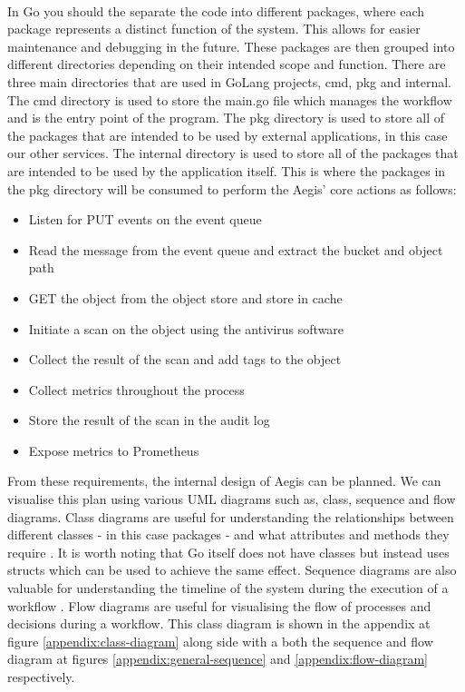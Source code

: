 \documentclass[12pt, conference, final, a4paper, onecolumn, compsoc]{IEEEtran}
\begin{document}
\paragraph{}

In Go you should the separate the code into different packages, where each
package represents a distinct function of the system. This allows for easier
maintenance and debugging in the future. These packages are then grouped into
different directories depending on their intended scope and function. There are
three main directories that are used in GoLang projects, cmd, pkg and internal.
The cmd directory is used to store the main.go file which manages the workflow
and is the entry point of the program. The pkg directory is used to store all of
the packages that are intended to be used by external applications, in this case
our other services. The internal directory is used to store all of the packages
that are intended to be used by the application itself. This is where the
packages in the pkg directory will be consumed to perform the Aegis' core
actions as follows:

\begin{itemize}
  \item Listen for PUT events on the event queue
  \item Read the message from the event queue and extract the bucket and object
        path
  \item GET the object from the object store and store in cache
  \item Initiate a scan on the object using the antivirus software
  \item Collect the result of the scan and add tags to the object
  \item Collect metrics throughout the process
  \item Store the result of the scan in the audit log
  \item Expose metrics to Prometheus
\end{itemize}

From these requirements, the internal design of Aegis can be planned. We can
visualise this plan using various UML diagrams such as, class, sequence and flow
diagrams. Class diagrams are useful for understanding the relationships between
different classes - in this case packages - and what attributes and methods they
require \citep{class-diagrams}. It is worth noting that Go itself does not have
classes but instead uses structs which can be used to achieve the same effect.
Sequence diagrams are also valuable for understanding the timeline of the system
during the execution of a workflow \citep{uml-diagrams}. Flow diagrams are
useful for visualising the flow of processes and decisions during a workflow.
This class diagram is shown in the appendix at figure
\ref{appendix:class-diagram} along side with a both the sequence and flow
diagram at figures \ref{appendix:general-sequence} and
\ref{appendix:flow-diagram} respectively.
\end{document}
